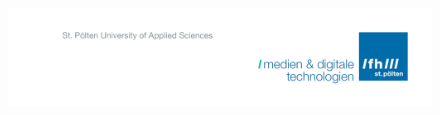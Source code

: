 
\pagestyle{empty}





\begin{figure}[H]
\vspace*{-2.5cm}
\hspace*{2.5cm}
\includegraphics[keepaspectratio, width=1.4\textwidth, right]{img/fhLogo3.png}
\end{figure}


